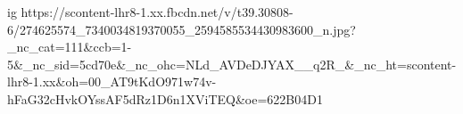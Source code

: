  
 
 
 
 

\ifcmt
  ig https://scontent-lhr8-1.xx.fbcdn.net/v/t39.30808-6/274625574_7340034819370055_2594585534430983600_n.jpg?_nc_cat=111&ccb=1-5&_nc_sid=5cd70e&_nc_ohc=NLd_AVDeDJYAX__q2R_&_nc_ht=scontent-lhr8-1.xx&oh=00_AT9tKdO971w74v-hFaG32cHvkOYssAF5dRz1D6n1XViTEQ&oe=622B04D1
\fi
